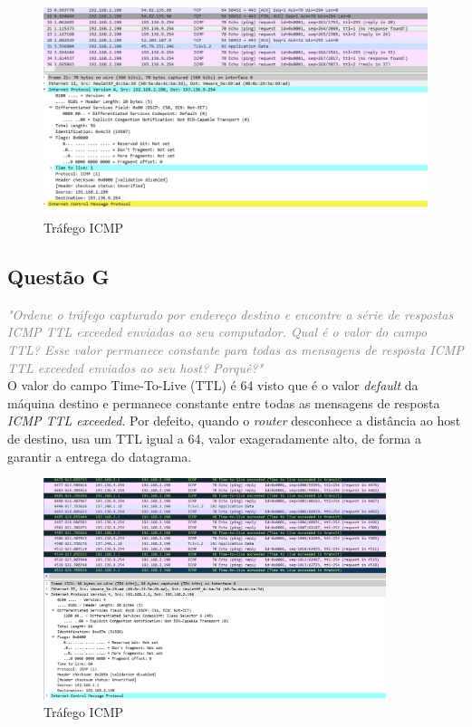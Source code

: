 \documentclass{llncs}
\newcommand{\questionE}[1]{\textcolor{gray}{\textit{"#1"}}}
\begin{document}
\begin{figure}[H]
\begin{center}
\includegraphics[width=12cm]{2ef.PNG}
\end{center}
\caption{Tráfego ICMP}
\end{figure}

\subsection{Questão G}
\hspace{3mm}
\questionE{Ordene o tráfego capturado por endereço destino e encontre a série de respostas ICMP TTL exceeded enviadas ao seu computador. Qual é o valor do campo TTL? Esse valor permanece constante para todas as mensagens de resposta ICMP TTL exceeded enviados ao seu host? Porquê?}\\

O valor do campo Time-To-Live (TTL) é 64 visto que é o valor \textit{default} da máquina destino e permanece constante entre todas as mensagens de resposta \textit{ICMP TTL exceeded}. Por defeito, quando o \textit{router} desconhece a distância ao host de destino, usa um TTL igual a 64, valor exageradamente alto, de forma a garantir a entrega do datagrama.

\begin{figure}[H]
\begin{center}
\includegraphics[width=10cm]{2g.PNG}
\end{center}
\caption{Tráfego ICMP}
\end{figure}
\end{document}
